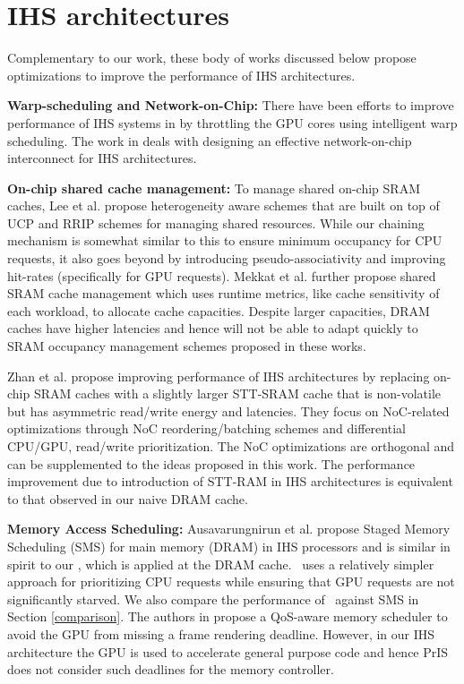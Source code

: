 \begin{itemize}
\end{itemize}
\section{IHS architectures} \label{related-work-ihs-architecture}
Complementary to our work, these body of works discussed below propose optimizations to improve the performance of IHS architectures. 
\par \textbf{Warp-scheduling and Network-on-Chip:} There have been efforts to improve performance of IHS systems in \cite{gpu-concurrency} by throttling the GPU cores using intelligent warp scheduling. The work in \cite{interconnect} deals with designing an effective network-on-chip interconnect for IHS architectures. 
\par \textbf{On-chip shared cache management:} To manage shared on-chip SRAM caches, Lee et al. \cite{tap}  propose heterogeneity aware schemes that are built on top of UCP and RRIP schemes for managing shared resources. While our chaining mechanism is somewhat similar to this to ensure minimum occupancy for CPU requests, it also goes beyond by introducing pseudo-associativity and improving hit-rates (specifically for GPU requests). Mekkat et al. \cite{helm} further propose shared SRAM cache management which uses runtime metrics, like cache sensitivity of each workload, to allocate cache capacities. Despite larger capacities, DRAM caches have higher latencies and hence will not be able to adapt quickly to SRAM occupancy management schemes proposed in these works. 
\par Zhan et al. \cite{oscar} propose improving performance of IHS architectures by replacing on-chip SRAM caches with a slightly larger STT-SRAM cache that is non-volatile but has asymmetric read/write energy and latencies. They focus on NoC-related optimizations through NoC reordering/batching schemes and differential CPU/GPU, read/write prioritization. The NoC optimizations are orthogonal and can be supplemented to the ideas proposed in this work. The performance improvement due to introduction of STT-RAM in IHS architectures is equivalent to that observed in our naive DRAM cache.
\par \textbf{Memory Access Scheduling:} Ausavarungnirun et al. \cite{sms} propose Staged Memory Scheduling (SMS) for main memory (DRAM) in IHS processors and is similar in spirit to our \prioname, which is applied at the DRAM cache. \prioname\ uses a relatively simpler approach for prioritizing CPU requests while ensuring that GPU requests are not significantly starved. We also compare the performance of \cachename\ against SMS in Section \ref{comparison}. The authors in \cite{qos-aware} propose a QoS-aware memory scheduler to avoid the GPU from missing a frame rendering deadline. However, in our IHS architecture the GPU is used to accelerate general purpose code and hence PrIS does not consider such deadlines for the memory controller.
